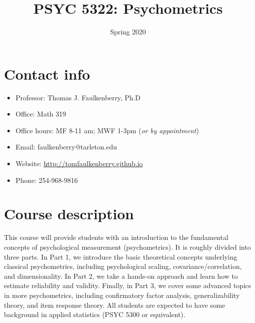 \documentclass[10pt]{article}
\date{Spring 2020}
\title{PSYC 5322: Psychometrics}
\begin{document}
\maketitle

\section*{Contact info}
\label{sec:org7d95c28}
\begin{itemize}
\item Professor: Thomas J. Faulkenberry, Ph.D
\item Office: Math 319
\item Office hours: MF 8-11 am; MWF 1-3pm (\emph{or by appointment})
\item Email: faulkenberry@tarleton.edu
\item Website: \url{http://tomfaulkenberry.github.io}
\item Phone: 254-968-9816
\end{itemize}

\section*{Course description}
\label{sec:orgf304584}

This course will provide students with an introduction to the fundamental concepts of psychological measurement (psychometrics). It is roughly divided into three parts. In Part 1, we introduce the basic theoretical concepts underlying classical psychometrics, including psychological scaling, covariance/correlation, and dimensionality. In Part 2, we take a hands-on approach and learn how to estimate reliability and validity. Finally, in Part 3, we cover some advanced topics in more psychometrics, including confirmatory factor analysis, generalizability theory, and item response theory. All students are expected to have some background in applied statistics (PSYC 5300 or equivalent). 
\end{document}
